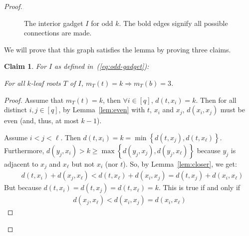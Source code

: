 \documentclass[11pt,letter]{article}
\newtheorem{claim}[theorem]{Claim}
\theoremstyle{remark}
\newcommand{\set}[1]{\left\{#1\right\}}
\begin{document}
\begin{proof}
\begin{figure}[!ht]
        \caption{The interior gadget $I$ for odd $k$. The bold edges signify all possible connections are made. }\label{fig:interior-odd}
    \end{figure}

    We will prove that this graph satisfies the lemma by proving three claims.

    \begin{claim}\label{cl:induction-odd-Top-1}
        For $I$ as defined in~(\ref{eq:odd-gadget}):
        
        For all $k$-leaf roots $T$ of $I$, $m_T(t)=k\Longrightarrow m_T(b)=3$.
    \end{claim}
    \begin{proof}
        Assume that $m_T(t)=k$, then $\forall i\in [q]$, $d(t,x_i)=k$. Then for all distinct $i, j \in [q]$, by Lemma~\ref{lem:even} with $t$, $x_i$ and $x_j$, $d(x_i,x_j)$ must be even (and, thus, at most $k-1$).

        Assume $i<j<\ell$. Then $d(t,x_i)=k=\min\set{d(t,x_j),d(t,x_\ell)}$. Furthermore, $d(y_j,x_i)>k\geq \max\set{d(y_j,x_j),d(y_j,x_\ell)}$ because $y_j$ is adjacent to $x_j$ and $x_\ell$ but not $x_i$ (nor $t$). So, by Lemma~\ref{lem:closer}, we get:
        \begin{align*}
            &d(t,x_i)+d(x_j,x_\ell)<d(t,x_\ell)+d(x_i,x_j)=d(t,x_j)+d(x_i,x_\ell)
        \end{align*} 
But because $d(t,x_i)=d(t,x_j)=d(t,x_\ell)=k$. This is true if and only if
   \begin{align*}
       d(x_j,x_\ell)<d(x_i,x_j)=d(x_i,x_\ell)
        \end{align*} 


\end{proof}
\end{proof}
\end{document}
